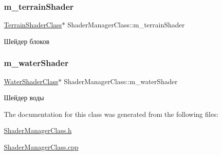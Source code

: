 \subsubsection{\texorpdfstring{m\+\_\+terrain\+Shader}{m\_terrainShader}}
{\footnotesize\ttfamily \hyperlink{class_terrain_shader_class}{Terrain\+Shader\+Class}$\ast$ Shader\+Manager\+Class\+::m\+\_\+terrain\+Shader\hspace{0.3cm}{\ttfamily [private]}}



Шейдер блоков 

\mbox{\label{class_shader_manager_class_aee012818f0b1fd4c4251cc4c240c074c}} 
\subsubsection{\texorpdfstring{m\+\_\+water\+Shader}{m\_waterShader}}
{\footnotesize\ttfamily \hyperlink{class_water_shader_class}{Water\+Shader\+Class}$\ast$ Shader\+Manager\+Class\+::m\+\_\+water\+Shader\hspace{0.3cm}{\ttfamily [private]}}



Шейдер воды 



The documentation for this class was generated from the following files\+:\begin{DoxyCompactItemize}
\item 
\hyperlink{_shader_manager_class_8h}{Shader\+Manager\+Class.\+h}\item 
\hyperlink{_shader_manager_class_8cpp}{Shader\+Manager\+Class.\+cpp}\end{DoxyCompactItemize}
